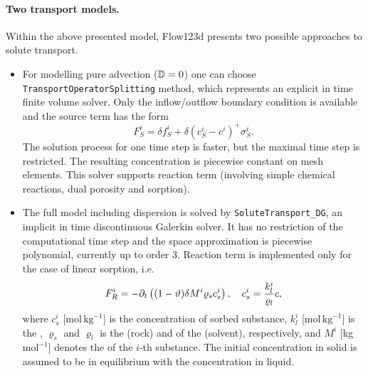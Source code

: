 \paragraph{Two transport models.}
Within the above presented model, Flow123d presents two possible approaches to solute transport.
\begin{itemize}
\item For modelling pure advection (${\mathbb{D}}=0$) one can choose {\tt TransportOperatorSplitting} method, which represents an explicit in time finite volume solver. 
Only the inflow/outflow boundary condition is available and the source term has the form
\[ F_S^i = \delta f_S^i + \delta(c_S^i-c^i)^+\sigma_S^i. \]
The solution process for one time step is faster, but the maximal time step is restricted. The resulting concentration is piecewise constant on mesh elements. This solver supports reaction term (involving simple chemical reactions, dual porosity and sorption).
\item The full model including dispersion is solved by {\tt SoluteTransport\_DG}, an implicit in time discontinuous Galerkin solver. It has no restriction of the computational time step and the space approximation is piecewise polynomial, currently up to order 3.
Reaction term is implemented only for the case of linear sorption, i.e.
\[ F_R^i = -\partial_t\left((1-\vartheta)\delta M^i\varrho_s c_s^i\right), \quad c_s^i = \frac{k_l^i}{\varrho_l} c, \]
where $c_s^i$ [mol\,$\mathrm{kg}^{-1}$] is the concentration of sorbed substance, $k_l^i$ [mol\,$\mathrm{kg}^{-1}$] is the , $\varrho_s$ and $\varrho_l$  is the  (rock) and of the  (solvent), respectively, and $M^i$ [kg\,$\mathrm{mol}^{-1}$] denotes the  of the $i$-th substance.
The initial concentration in solid is assumed to be in equilibrium with the concentration in liquid. 
\end{itemize}


